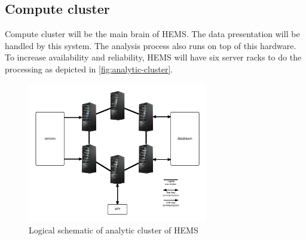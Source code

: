 \subsection{Compute cluster}
\label{subsec:analytics}
Compute cluster will be the main brain of HEMS. The data presentation will be handled by this system. The analysis process also runs on top of this hardware. To increase availability and reliability, HEMS will have six server racks to do the processing as depicted in \autoref{fig:analytic-cluster}.

\begin{figure}[H]
\centering
\includegraphics[width=0.7\textwidth]{6-hardware/images/analytic-cluster.png}
\caption{Logical schematic of analytic cluster of HEMS}
\label{fig:analytic-cluster}
\end{figure}